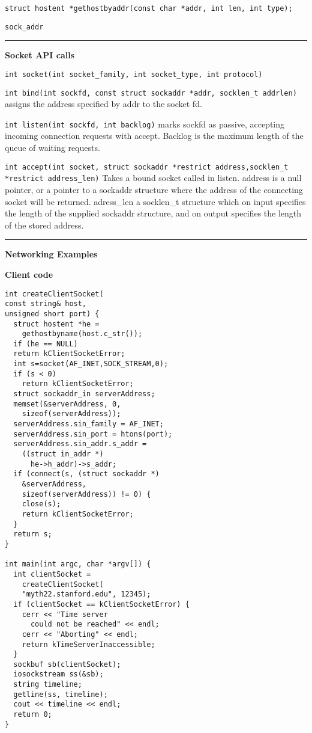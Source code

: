 \documentclass{article}
\begin{document}
\begin{multicols}{2}
  {\tt struct hostent *gethostbyaddr(const char *addr, int len, int type);}

  {\tt sock\_addr}

  \noindent\rule{4cm}{0.4pt}

  {\bf Socket API calls}

  {\tt int socket(int socket\_family, int socket\_type, int protocol)}

  {\tt int bind(int sockfd, const struct sockaddr *addr, socklen\_t addrlen)}
  assigns the address specified by addr to the socket fd.

  {\tt int listen(int sockfd, int backlog)} marks sockfd as passive, accepting
  incoming connection requests with accept. Backlog is the maximum length of the
  queue of waiting requests.

  {\tt int accept(int socket, struct sockaddr *restrict address,socklen\_t
  *restrict address\_len)} Takes a bound socket called in listen. address is a
  null pointer, or a pointer to a sockaddr structure where the address of the
  connecting socket will be returned. adress\_len a socklen\_t structure which on
  input specifies the length of the supplied sockaddr structure, and on output
  specifies the length of the stored address.

  \noindent\rule{4cm}{0.4pt}

  {\bf Networking Examples}

  {\bf Client code}
  \begin{verbatim}
int createClientSocket(
const string& host,
unsigned short port) {
  struct hostent *he =
    gethostbyname(host.c_str());
  if (he == NULL)
  return kClientSocketError;
  int s=socket(AF_INET,SOCK_STREAM,0);
  if (s < 0)
    return kClientSocketError;
  struct sockaddr_in serverAddress;
  memset(&serverAddress, 0,
    sizeof(serverAddress));
  serverAddress.sin_family = AF_INET;
  serverAddress.sin_port = htons(port);
  serverAddress.sin_addr.s_addr =
    ((struct in_addr *)
      he->h_addr)->s_addr;
  if (connect(s, (struct sockaddr *)
    &serverAddress,
    sizeof(serverAddress)) != 0) {
    close(s);
    return kClientSocketError;
  }
  return s;
}

int main(int argc, char *argv[]) {
  int clientSocket =
    createClientSocket(
    "myth22.stanford.edu", 12345);
  if (clientSocket == kClientSocketError) {
    cerr << "Time server
      could not be reached" << endl;
    cerr << "Aborting" << endl;
    return kTimeServerInaccessible;
  }
  sockbuf sb(clientSocket);
  iosockstream ss(&sb);
  string timeline;
  getline(ss, timeline);
  cout << timeline << endl;
  return 0;
}
  \end{verbatim}


\end{multicols}
\end{document}
